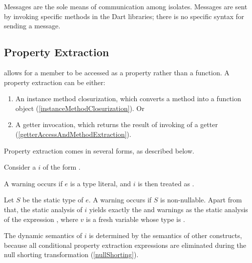 \documentclass[makeidx]{article}
\begin{document}
{\LMHash{}%
Messages are the sole means of communication among isolates.
Messages are sent by invoking specific methods in the Dart libraries; there is no specific syntax for sending a message.



\subsection{Property Extraction}

\LMHash{}%
allows for a member to be accessed as a property rather than a function.
A property extraction can be either:
\begin{enumerate}
\item An instance method closurization,
  which converts a method into a function object
  (\ref{instanceMethodClosurization}).
  Or
\item A getter invocation, which returns
  the result of invoking of a getter
  (\ref{getterAccessAndMethodExtraction}).
\end{enumerate}


\LMHash{}%
Property extraction comes in several forms, as described below.

\LMHash{}%
Consider a 
%
$i$ of the form .

\LMHash{}%
A warning occurs if $e$ is a type literal,
and $i$ is then treated as .

\LMHash{}%
Let $S$ be the static type of $e$.
A warning occurs if $S$ is non-nullable.
Apart from that,
the static analysis of $i$ yields
exactly the  and warnings as
the static analysis of the expression ,
where $v$ is a fresh variable whose type is .

\LMHash{}%
The dynamic semantics of $i$ is determined by the semantics of other constructs,
because all conditional property extraction expressions are eliminated during
the null shorting transformation
(\ref{nullShorting}).
\EndCase

}
\end{document}

